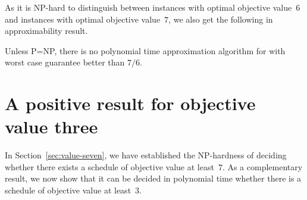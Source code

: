 As it is NP-hard to distinguish between {\xxxNTP} instances with optimal objective value~$6$ 
and {\xxxNTP} instances with optimal objective value~$7$, we also get the following 
in approximability result.
\begin{corollary}
\label{coro:inapproximability}
Unless P=NP, there is no polynomial time approximation algorithm for {\xxxNTP} with
worst case guarantee better than $7/6$.
 
\end{corollary}


\section{A positive result for objective value three}
\label{sec:value-three}
In Section~\ref{sec:value-seven}, we have established the NP-hardness of deciding whether 
there exists a schedule of objective value at least~$7$. 
As a complementary result, we now show that it can be decided in polynomial time whether there is
a schedule of objective value at least~$3$.

